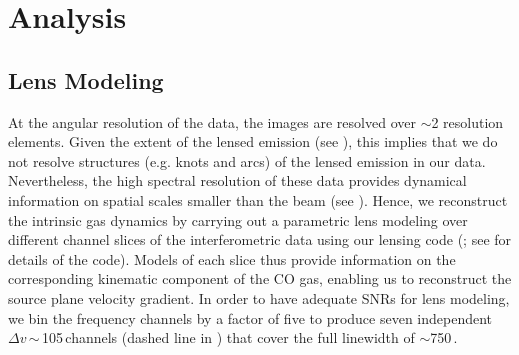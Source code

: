 \documentclass[]{emulateapj}
\begin{document}
\section{Analysis} \label{sec:anal}
%
%

\subsection{Lens Modeling} \label{sec:lensmodel}
At the angular resolution of the \bco data, the images are resolved over
$\sim$2 resolution elements. 
Given the extent of the lensed emission (see ),
this implies that we do not resolve
structures (e.g. knots and arcs) of the lensed emission
in our \bco data.
 Nevertheless, the high spectral
resolution of these data provides dynamical information on
spatial scales smaller than the beam (see ).
Hence, we reconstruct the intrinsic gas dynamics  %
by carrying out a parametric lens modeling over different
channel slices of the interferometric data using our lensing code
\uvmcmcfit
(\citealt{uvmcmcfit15a}; see \citealt{Bussmann15a} for details of the code).
Models of each slice thus provide information on 
the corresponding kinematic component of the CO gas, 
enabling us to reconstruct the source plane velocity gradient. 
In order to have adequate SNRs for lens modeling, we bin the frequency channels by a factor of five 
to produce seven independent $\Delta v$\,$\sim$\,105\,\kms channels (dashed line in )
that cover the full linewidth of $\sim$750\,\kms. 
\end{document}
